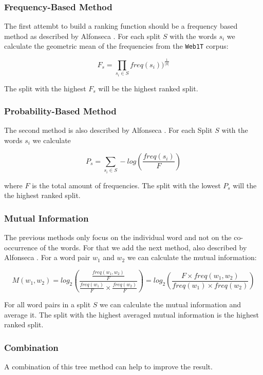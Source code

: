 \documentclass[11pt, accentcolor=tud9b, nochapname]{tudexercise}
\begin{document}
\subsubsection{Frequency-Based Method}
The first attembt to build a ranking function should be a frequency based method as described by Alfonseca \cite{alf2008}. For each split $S$ with the words $s_i$ we calculate the geometric mean of the frequencies from the \texttt{Web1T} corpus:

\begin{equation}
  F_s = \prod_{s_i \in S} freq(s_i))^{\frac{1}{|S|}}
\end{equation}

The split with the highest $F_s$ will be the highest ranked split.

\subsubsection{Probability-Based Method}
The second method is also described by Alfonseca \cite{alf2008}. For each Split $S$ with the words $s_i$ we calculate

\begin{equation}
  P_s = \sum_{s_i \in S} -log(\frac{freq(s_i)}{F})
\end{equation}

where $F$ is the total amount of frequencies. The split with the lowest $P_s$ will the the highest ranked split.

\subsubsection{Mutual Information}
The previous methods only focus on the individual word and not on the co-occurrence of the words. For that we add the next method, also described by Alfonseca \cite{alf2008}. For a word pair $w_1$ and $w_2$ we can calculate the mutual information:

\begin{equation}
  M(w_1, w_2) = log_2(\frac{\frac{freq(w_1, w_2)}{F}}
    {\frac{freq(w_1)}{F} \times \frac{freq(w_2)}{F}})
    = log_2(\frac{F \times freq(w_1, w_2)}{freq(w_1) \times freq(w_2)})
\end{equation}

For all word pairs in a split $S$ we can calculate the mutual information and average it. The split with the highest averaged mutual information is the highest ranked split.

\subsubsection{Combination}
A combination of this tree method can help to improve the result.
\end{document}
